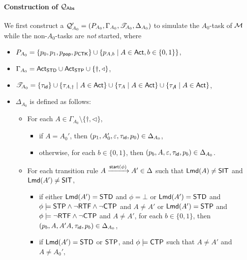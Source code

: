 \paragraph{Construction of ${\mathcal{Q} }_{{\mathsf{Abs} }}$} 
We first construct a {\WOTrPDS} ${\mathcal{Q} }'_{A_0} = (P_{A_0},\Gamma_{A_0},{\mathscr{T} }_{A_0},\Delta_{A_0})$ to simulate the $A_0$-task of ${\mathcal{M} }$ while the non-$A_0$-tasks are \emph{not} started, where
\begin{itemize}
    \item $P_{A_0} = \{p_0,p_1, p_{\mathsf{pop}}, p_{{\sf CTK}}\}\cup\{p_{A,b}\mid A\in{\sf Act}, b\in\{0,1\}\}$,
    \item $\Gamma_{A_0} = {\sf Act}_{\mathsf{STD}} \cup {\sf Act}_{\mathsf{STP}} \cup \{\dag,\triangleleft\}$, 
    \item ${\mathscr{T} }_{A_0} = \{\tau_{\mathsf{id}} \}\cup \{\tau_{A, \dag} \mid A \in {\sf Act}\} \cup \{\tau_{A} \mid A \in {\sf Act}\}  \cup \{\tau_{\not A} \mid A \in {\sf Act}\}$,
    \item $\Delta_{A_0}$ is defined as follows:
            \begin{itemize}
                \item For each $A \in \Gamma_{A_0}\setminus\{\dag,\triangleleft\}$, 
                \begin{itemize}
                    \item if $A = A_0'$, then $(p_1,A_0',\varepsilon,\tau_{\mathsf{id}},p_0)\in\Delta_{A_0}$,
                    \item otherwise, for each $b\in\{0,1\}$, then $(p_b,A,\varepsilon,\tau_{\mathsf{id}},p_b)\in\Delta_{A_0}$.
                \end{itemize}
                \item For each transition rule $A\xrightarrow{{\mathsf{start} }(\phi)}A'\in\Delta$ such that ${\sf Lmd}(A)\neq\mathsf{SIT}$ and ${\sf Lmd}(A')\neq\mathsf{SIT}$,
                \begin{itemize}
                    \item if either ${\sf Lmd}(A') = \mathsf{STD}$ and $\phi = \bot$ or ${\sf Lmd}(A') = \mathsf{STD}$ and $\phi\models{\sf STP}\wedge\neg{\sf RTF}\wedge\neg{\sf CTP}$ and $A\neq A'$ or ${\sf Lmd}(A') = \mathsf{STP}$ and $\phi\models\neg{\sf RTF}\wedge\neg{\sf CTP}$ and $A\neq A'$, 
                    for each $b\in\{0,1\}$, then $(p_b, A, A'A, \tau_{\mathsf{id}}, p_b) \in \Delta_{A_0}$, 
                    \item if ${\sf Lmd}(A') = \mathsf{STD}$ or $\mathsf{STP}$, and $\phi\models {\sf CTP}$ such that $A\neq A'$ and $A\neq A_0'$,

\end{itemize}
\end{itemize}
\end{itemize}
